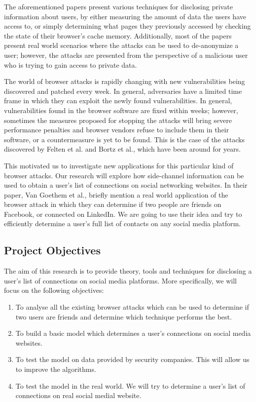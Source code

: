 \documentclass[a4paper,11pt]{article}
\begin{document}
The aforementioned papers present various techniques for disclosing private information about users, by either measuring the amount of data the users have access to, or simply determining what pages they previously accessed by checking the state of their browser's cache memory. Additionally, most of the papers present real world scenarios where the attacks can be used to de-anonymize a user; however, the attacks are presented from the perspective of a malicious user who is trying to gain access to private data.

The world of browser attacks is rapidly changing with new vulnerabilities being discovered and patched every week. In general, adversaries have a limited time frame in which they can exploit the newly found vulnerabilities. In general, vulnerabilities found in the browser software are fixed within weeks; however, sometimes the measures proposed for stopping the attacks will bring severe performance penalties and browser vendors refuse to include them in their software, or a countermeasure is yet to be found. This is the case of the attacks discovered by Felten et al.\cite{felten2000timing} and Bortz et al.\cite{bortz2007exposing}, which have been around for years. 

This motivated us to investigate new applications for this particular kind of browser attacks. Our research will explore how side-channel information can be used to obtain a user's list of connections on social networking websites. In their paper, Van Goethem et al.\cite{van2015clock}, briefly mention a real world application of the browser attack in which they can determine if two people are friends on Facebook, or connected on LinkedIn. We are going to use their idea and try to efficiently determine a user's full list of contacts on any social media platform.


\subsection*{Project Objectives}

The aim of this research is to provide theory, tools and techniques for disclosing a user's list of connections on social media platforms. More specifically, we will focus on the following objectives:
\begin{enumerate}
\item To analyse all the existing browser attacks which can be used to determine if two users are friends and determine which technique performs the best.
\item To build a basic model which determines a user's connections on social media websites. 
\item To test the model on data provided by security companies. This will allow us to improve the algorithms.
\item To test the model in the real world. We will try to determine a user's list of connections on real social medial website.
\end{enumerate}
\end{document}
